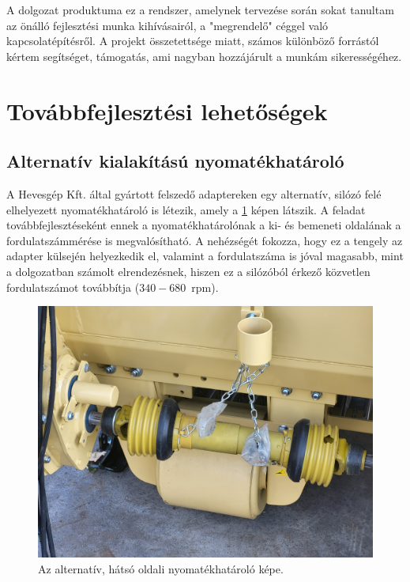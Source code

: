 A dolgozat produktuma ez a rendszer, amelynek tervezése során sokat tanultam az önálló fejlesztési munka kihívásairól, a "megrendelő" céggel való kapcsolatépítésről. A projekt összetettsége miatt, számos különböző forrástól kértem segítséget, támogatás, ami nagyban hozzájárult a munkám sikerességéhez.

\section{Továbbfejlesztési lehetőségek}

\subsection{Alternatív kialakítású nyomatékhatároló}

A Hevesgép Kft. által gyártott felszedő adaptereken egy alternatív, silózó felé elhelyezett nyomatékhatároló is létezik, amely a \ref{hatso_nyomhat} képen látszik. A feladat továbbfejlesztéseként ennek a nyomatékhatárolónak a ki- és bemeneti oldalának a fordulatszámmérése is megvalósítható. A nehézségét fokozza, hogy ez a tengely az adapter külsején helyezkedik el, valamint a fordulatszáma is jóval magasabb, mint a dolgozatban számolt elrendezésnek, hiszen ez a silózóból érkező közvetlen fordulatszámot továbbítja ($340 - 680$~rpm).
\begin{figure}
	\centering
	\includegraphics[width=\columnwidth*7/10]{figures/hatso_nyomatekhatarolo.jpg}
	\caption{Az alternatív, hátsó oldali nyomatékhatároló képe.}
	\label{hatso_nyomhat}
\end{figure}


